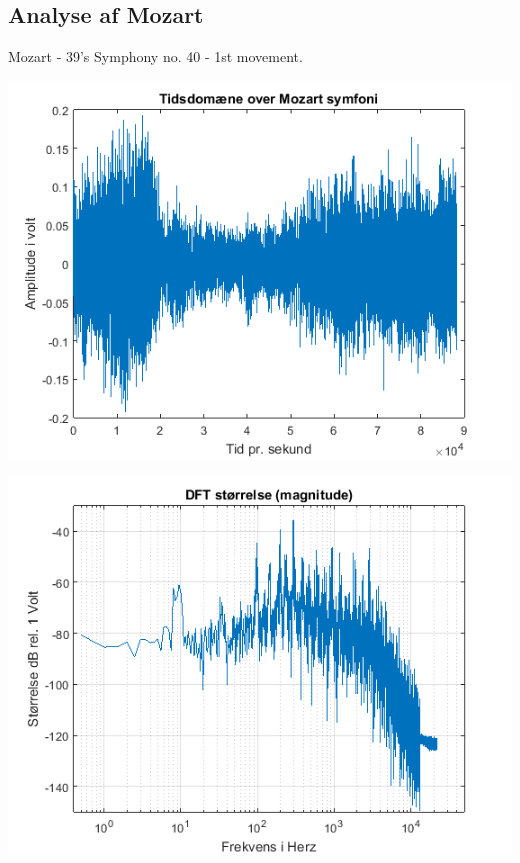 \documentclass[12pt, letterpaper]{article}
\begin{document}
\subsection{Analyse af Mozart}
Mozart - 39's Symphony no. 40 - 1st movement. 

\begin{center}
\includegraphics[width=\textwidth]{billeder/mozarttid}
\end{center}

\begin{center}
\includegraphics[width=\textwidth]{billeder/mozartstorrelse}
\end{center}
\end{document}
